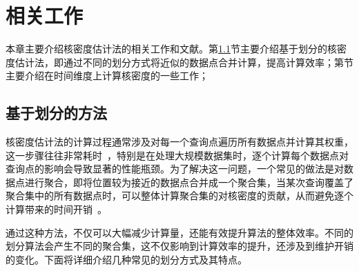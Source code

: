 \chapter{相关工作}

本章主要介绍核密度估计法的相关工作和文献。第\ref{sec:2.1}节主要介绍基于划分的核密度估计法，即通过不同的划分方式将近似的数据点合并计算，提高计算效率；第\label{sec:2.2}节主要介绍在时间维度上计算核密度的一些工作；

\section{基于划分的方法}
\label{sec:2.1}

核密度估计法的计算过程通常涉及对每一个查询点遍历所有数据点并计算其权重，这一步骤往往非常耗时~\cite{gramacki_nonparametric_2018}，特别是在处理大规模数据集时，逐个计算每个数据点对查询点的影响会导致显著的性能瓶颈。为了解决这一问题，一个常见的做法是对数据点进行聚合，即将位置较为接近的数据点合并成一个聚合集，当某次查询覆盖了聚合集中的所有数据点时，可以整体计算聚合集的对核密度的贡献，从而避免逐个计算带来的时间开销~\cite{liu_immens_2013}。

通过这种方法，不仅可以大幅减少计算量，还能有效提升算法的整体效率。不同的划分算法会产生不同的聚合集，这不仅影响到计算效率的提升，还涉及到维护开销的变化。下面将详细介绍几种常见的划分方式及其特点。

